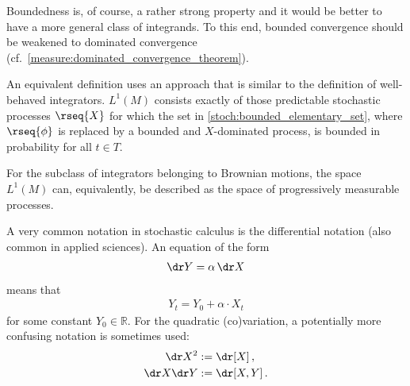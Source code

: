     Boundedness is, of course, a rather strong property and it would be better to have a more general class of integrands. To this end, bounded convergence should be weakened to dominated convergence (cf.~\cref{measure:dominated_convergence_theorem}).
    \begin{remark}
        An equivalent definition uses an approach that is similar to the definition of well-behaved integrators. $L^1(M)$ consists exactly of those predictable stochastic processes $\rseq{X}$ for which the set in \cref{stoch:bounded_elementary_set}, where $\rseq{\phi}$ is replaced by a bounded and $X$-dominated process, is bounded in probability for all $t\in T$.
    \end{remark}
    \begin{property}
        For the subclass of integrators belonging to Brownian motions, the space $L^1(M)$ can, equivalently, be described as the space of progressively measurable processes.
    \end{property}

    \begin{notation}[Differential]
        A very common notation in stochastic calculus is the differential notation (also common in applied sciences). An equation of the form
        \begin{gather}
            \dr Y = \alpha\,\dr X
        \end{gather}
        means that
        \begin{gather}
            Y_t = Y_0 + \alpha\cdot X_t
        \end{gather}
        for some constant $Y_0\in\mathbb{R}$. For the quadratic (co)variation, a potentially more confusing notation is sometimes used:
        \begin{gather}
            \begin{aligned}
                \dr X^2 &:= \dr[X]\,,\\
                \dr X\dr Y &:= \dr[X,Y]\,.
            \end{aligned}
        \end{gather}
    \end{notation}

